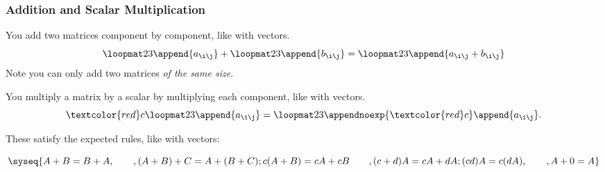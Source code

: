 \begin{frame}
\frametitle{Addition and Scalar Multiplication}

You add two matrices component by component, like with vectors.
\[ \loopmat23{\append{a_{\i\j}}} + \loopmat23{\append{b_{\i\j}}}
= \loopmat23{\append{a_{\i\j}+b_{\i\j}}} \]
\pause
Note you can only add two matrices \emph{of the same size}.

\pause\bigskip
You multiply a matrix by a scalar by multiplying each component, like with
vectors.
\[ \def\r{\textcolor{red}}
\r c\loopmat23{\append{a_{\i\j}}}
= \loopmat23{\appendnoexp{\textcolor{red}c}\append{a_{\i\j}}}. \]

\pause\bigskip
These satisfy the expected rules, like with vectors:
\begin{webonly}
\[\syseq{A+B = B+A\hfill, \qquad,
  (A+B)+C = A+(B+C);
  c(A+B) = cA+cB \qquad,
  (c+d)A = cA+dA\hfill ;
  (cd)A = c(dA)\hfill, \qquad,
  A+0 = A\hfill}
\]
\end{webonly}

\end{frame}



